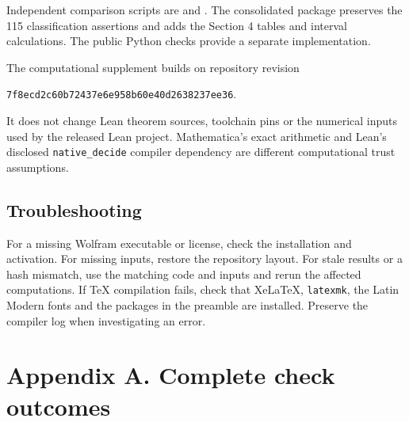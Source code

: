 \documentclass[12pt]{amsart}
\theoremstyle{remark}
\theoremstyle{definition}
\numberwithin{equation}{section}
\begin{document}
Independent comparison scripts are  and
. The consolidated package
preserves the 115 classification assertions and adds the Section 4 tables
and interval calculations. The public Python checks provide a separate
implementation.

The computational supplement builds on repository revision
\begin{center}
\small\texttt{7f8ecd2c60b72437e6e958b60e40d2638237ee36}.
\end{center}
It does not change Lean theorem sources, toolchain pins or the numerical
inputs used by the released Lean project. Mathematica's exact arithmetic
and Lean's disclosed \texttt{native\_decide} compiler dependency are
different computational trust assumptions.

\subsection*{Troubleshooting}
For a missing Wolfram executable or license, check the installation and
activation. For missing inputs, restore the repository layout. For stale
results or a hash mismatch, use the matching code and inputs and rerun the
affected computations. If TeX compilation fails, check that XeLaTeX,
\texttt{latexmk}, the Latin Modern fonts and the packages in the preamble are
installed. Preserve the compiler log when investigating an error.

\clearpage
\section*{Appendix A. Complete check outcomes}
\end{document}
